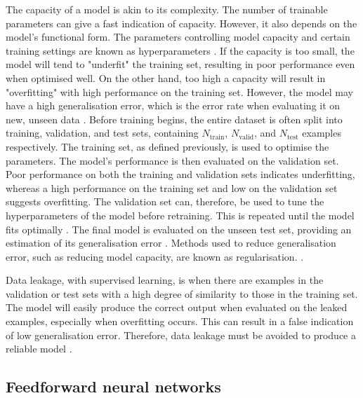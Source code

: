 \documentclass[12pt]{article}
\begin{document}
The capacity of a model is akin to its complexity. The number of trainable parameters can give a fast indication of capacity. However, it also depends on the model's functional form. The parameters controlling model capacity and certain training settings are known as hyperparameters \cite{Goodfellow16}. If the capacity is too small, the model will tend to "underfit" the training set, resulting in poor performance even when optimised well. On the other hand, too high a capacity will result in "overfitting" with high performance on the training set. However, the model may have a high generalisation error, which is the error rate when evaluating it on new, unseen data \cite{Murphy12, Goodfellow16}. Before training begins, the entire dataset is often split into training, validation, and test sets, containing $N_{\mathrm{train}}$, $N_{\mathrm{valid}}$, and $N_{\mathrm{test}}$ examples respectively. The training set, as defined previously, is used to optimise the parameters. The model's performance is then evaluated on the validation set. Poor performance on both the training and validation sets indicates underfitting, whereas a high performance on the training set and low on the validation set suggests overfitting. The validation set can, therefore, be used to tune the hyperparameters of the model before retraining. This is repeated until the model fits optimally \cite{Murphy12, Goodfellow16}. The final model is evaluated on the unseen test set, providing an estimation of its generalisation error \cite{Murphy12}. Methods used to reduce generalisation error, such as reducing model capacity, are known as regularisation. \cite{Goodfellow16}.

Data leakage, with supervised learning, is when there are examples in the validation or test sets with a high degree of similarity to those in the training set. The model will easily produce the correct output when evaluated on the leaked examples, especially when overfitting occurs. This can result in a false indication of low generalisation error. Therefore, data leakage must be avoided to produce a reliable model \cite{Kaufman12}.
\subsection{Feedforward neural networks}
\end{document}
